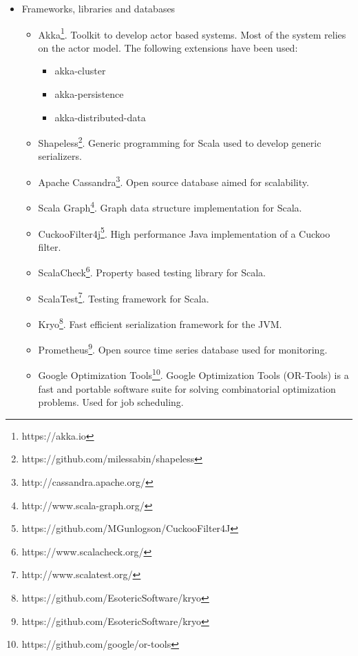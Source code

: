 \begin{itemize}
  \item Frameworks, libraries and databases
    \begin{itemize}
      \item Akka\footnote{https://akka.io}. Toolkit to develop actor based
        systems. Most of the system relies on the actor model. The following
        extensions have been used:
        \begin{itemize}
        \item akka-cluster
        \item akka-persistence
        \item akka-distributed-data
        \end{itemize}
      \item Shapeless\footnote{https://github.com/milessabin/shapeless}. Generic
        programming for Scala used to develop generic serializers.
      \item Apache Cassandra\footnote{http://cassandra.apache.org/}. Open source
        database aimed for scalability.
      \item Scala Graph\footnote{http://www.scala-graph.org/}. Graph data
        structure implementation for Scala.
      \item
        CuckooFilter4j\footnote{https://github.com/MGunlogson/CuckooFilter4J}.
        High performance Java implementation of a Cuckoo filter.
      \item ScalaCheck\footnote{https://www.scalacheck.org/}. Property based
        testing library for Scala.
      \item ScalaTest\footnote{http://www.scalatest.org/}. Testing framework for
        Scala.
      \item Kryo\footnote{https://github.com/EsotericSoftware/kryo}. Fast efficient serialization
        framework for the JVM.
      \item Prometheus\footnote{https://github.com/EsotericSoftware/kryo}. Open
        source time series database used for monitoring.
      \item Google Optimization
        Tools\footnote{https://github.com/google/or-tools}. Google Optimization
        Tools (OR-Tools) is a fast and portable software suite for solving
        combinatorial optimization problems. Used for job scheduling.
    \end{itemize}


\end{itemize}
